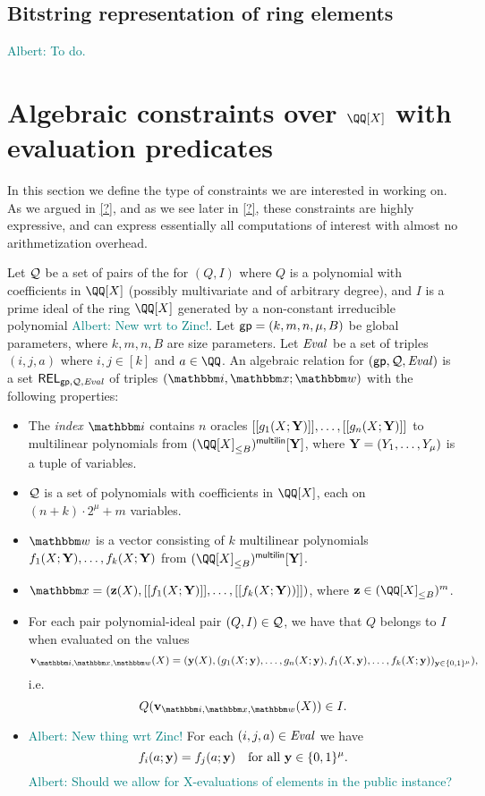 \documentclass[11pt,letterpaper,usenames,dvipsnames]{article}
\newcommand{\albert}[1]{\textcolor{teal}{Albert: {#1}}}
\begin{document}
\subsection{Bitstring representation of ring elements}\label{s: bistring_reps}
\albert{To do.}

\section{Algebraic constraints over $\QQ[X]$ with evaluation predicates}

In this section we define the type of constraints we are interested in working on. As we argued in \cref{?}, and as we see later in \cref{?}, these constraints are highly expressive, and can  express essentially all computations of interest with almost no arithmetization overhead.

\newcommand{\evalconstraints}{\text{\emph{Eval}}}
\newcommand{\mainQpolyring}{(\QQ[X]_{\leq B})}
\newcommand{\mainQpolyringmultilin}{(\QQ[X]_{\leq B})^{\multilin}}

Let $\mathcal{Q}$ be a set of pairs of the for $(Q, I)$ where $Q$ is a polynomial with coefficients in $\QQ[X]$ (possibly multivariate and of arbitrary degree), and $I$ is a prime ideal of the ring $\QQ[X]$ generated by a non-constant irreducible polynomial \albert{New wrt to Zinc!}. Let $\mathsf{gp} = (k, m, n, \mu, B)$ be global parameters, where $k,m,n,B$ are size parameters. Let $\evalconstraints$ be a set of triples $(i, j, a)$ where $i,j\in [k]$ and $a \in \QQ$. An algebraic relation for $(\gp,\cQ, \evalconstraints)$ is a set $\REL_{\gp, \cQ, \evalconstraints}$ of triples $(\idx, \inp;\wit)$ with the following properties:
\begin{itemize}
	\item The \emph{index} $\idx$ contains $n$ oracles $[[{g_1(X;\mathbf{Y})}]], \ldots, [[{g_n(X;\mathbf{Y})}]]$ to multilinear polynomials from $\mainQpolyring^\multilin[\YY]$, where $\mathbf{Y}=(Y_1,\ldots, Y_\mu) $ is a tuple of variables.
	 \item $\mathcal{Q}$ is a set of polynomials with coefficients in $\QQ[X]$, each on $(n+ k)\cdot 2^\mu + m$ variables.
	\item $\wit$ is a vector consisting of $k$ multilinear polynomials $f_1(X;\mathbf{Y}),\ldots, f_k(X;\mathbf{Y})$ from $\mainQpolyring^{\multilin}[\YY]$. %
	\item $\inp=(\zz(X), \oracle{f_1(X;\YY)}, \ldots, \oracle{f_k(X;\YY))})$, where $\zz\in \mainQpolyring^m$.
	\item For each pair polynomial-ideal pair $(Q,I)\in \mathcal{Q}$, we have that $Q$ belongs to $I$  when evaluated on the values $$\vv_{\idx, \inp,\wit}(X)=(\yy(X), (g_1(X;\yy),\ldots, g_n(X;\yy), f_1(X,\yy),\ldots, f_k(X;\yy))_{\yy\in \BB^\mu}),$$
    i.e.
    $$
    Q(\vv_{\idx, \inp,\wit}(X)) \in I.
    $$
    \item \albert{New thing wrt Zinc!} For each $(i,j,a)\in \evalconstraints$ we have
    $$
    f_i(a; \mathbf{y}) = f_j(a;\mathbf{y}) \quad \text{for all } \mathbf{y}\in \{0,1\}^\mu.
    $$
    \albert{Should we allow for X-evaluations of elements in the public instance?}
	\end{itemize}
\end{document}
